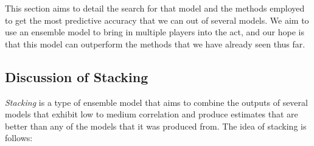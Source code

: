 \documentclass[10pt,a4paper, hidelinks]{article} %
\begin{document}
This section aims to detail the search for that model and the methods employed to get the most predictive accuracy that we can out of several models. We aim to use an ensemble model to bring in multiple players into the act, and our hope is that this model can outperform the methods that we have already seen thus far. 

\subsection{Discussion of Stacking}

\textit{Stacking} is a type of ensemble model that aims to combine the outputs of several models that exhibit low to medium correlation and produce estimates that are better than any of the models that it was produced from. The idea of stacking is follows:

\newcommand{\dattrain}{\ensuremath{Data_{train}}\xspace}
\newcommand{\datval}{\ensuremath{Data_{validation}}\xspace}
\newcommand{\dattest}{\ensuremath{Data_{test}}\xspace}
\newcommand{\dattestpreds}{\ensuremath{Data_{test + preds}}\xspace}
\newcommand{\datvaltest}{\ensuremath{Data_{validation + preds}}\xspace}
\end{document}
